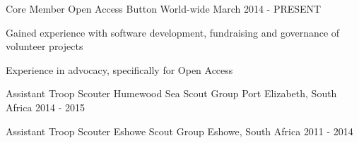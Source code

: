 


\begin{cventries}


\cventry
{Core Member} %
{Open Access Button} %
{World-wide} %
{March 2014 - PRESENT} %
{ %
\begin{cvitems}
\item {Gained experience with software development, fundraising and governance of volunteer projects}
\item {Experience in advocacy, specifically for Open Access}
\end{cvitems}
}


\cventry
{Assistant Troop Scouter} %
{Humewood Sea Scout Group} %
{Port Elizabeth, South Africa} %
{2014 - 2015} %
{ %
}

\cventry
{Assistant Troop Scouter} %
{Eshowe Scout Group} %
{Eshowe, South Africa} %
{2011 - 2014} %
{ %
}



\end{cventries}